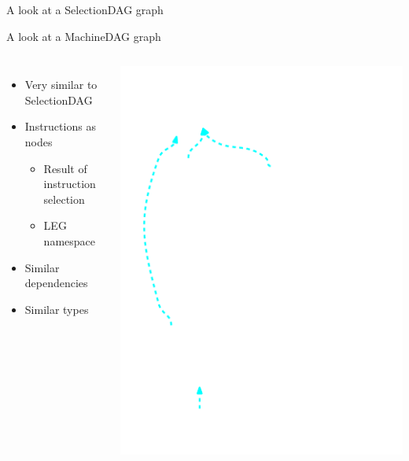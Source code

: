 \begin{frame}{A look at a SelectionDAG graph}
\end{frame}


\begin{frame}{A look at a MachineDAG graph}

\begin{columns}[t]
    \begin{itemize}
        \item Very similar to SelectionDAG
        \item Instructions as nodes
        \begin{itemize}
            \item Result of instruction selection
            \item LEG namespace
        \end{itemize}
        \item Similar dependencies
        \item Similar types
    \end{itemize}
    \begin{block}{}
        \vspace{-8ex}
        \includegraphics[width = 1.0\textwidth]{examples/ex1/ex1-entry-machine-dag.pdf}
    \end{block}
\end{columns}

\end{frame}

